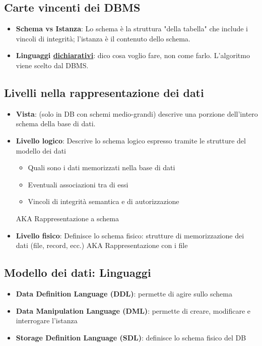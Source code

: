 \documentclass[12pt]{article}
\begin{document}
\subsection{Carte vincenti dei DBMS}
\begin{itemize}
    \setlength\itemsep{0em}
    \item \textbf{Schema vs Istanza}: Lo schema è la struttura "della tabella" che include i vincoli di integrità; l'istanza è il contenuto dello schema.
    \item \textbf{Linguaggi \uline{dichiarativi}}: dico cosa voglio fare, non come farlo. L'algoritmo viene scelto dal DBMS.
\end{itemize}
\subsection{Livelli nella rappresentazione dei dati}
\begin{itemize}
    \setlength\itemsep{0em}
    \item \textbf{Vista}: (solo in DB con schemi medio-grandi) descrive una porzione dell'intero schema della base di dati.
    \item \textbf{Livello logico}: Descrive lo schema logico espresso tramite le strutture del modello dei dati\begin{itemize}
        \item Quali sono i dati memorizzati nella base di dati
        \item Eventuali associazioni tra di essi
        \item Vincoli di integrità semantica e di autorizzazione
        
    \end{itemize}
    AKA Rappresentazione a schema 
    \item \textbf{Livello fisico}: Definisce lo schema fisico: strutture di memorizzazione dei dati (file, record, ecc.)
    AKA Rappresentazione con i file
\end{itemize}
\subsection{Modello dei dati: Linguaggi}
\begin{itemize}
    \item \textbf{Data Definition Language (DDL)}: permette di agire sullo schema
    \item \textbf{Data Manipulation Language (DML)}: permette di creare, modificare e interrogare l'istanza
    \item \textbf{Storage Definition Language (SDL)}: definisce lo schema fisico del DB
\end{itemize}
\end{document}
